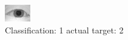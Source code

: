 \begin{figure}[h!]
\begin{center}
\includegraphics[width=0.60\columnwidth]{figures/ID869_class_1_target_2.png}
\end{center}
\caption{ Classification: 1 actual target: 2}
\label{fig:ID869_class_1_target_2}
\end{figure}
